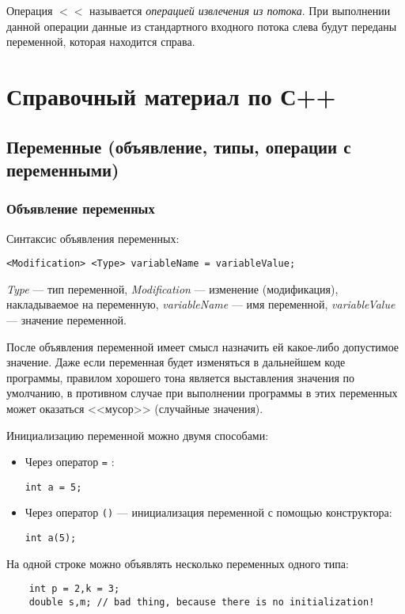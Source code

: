 Операция $<<$ называется \textit{операцией извлечения из потока}. При выполнении данной операции данные из стандартного входного потока слева будут переданы переменной, которая находится справа.

\section{Справочный материал по С++}

\subsection{Переменные (объявление, типы, операции с переменными)}

\subsubsection{Объявление переменных}
Синтаксис объявления переменных:

\lstinline|<Modification> <Type> variableName = variableValue;|

\textit{Type} --- тип переменной, \textit{Modification} --- изменение (модификация), накладываемое на переменную, \textit{variableName} --- имя переменной, \textit{variableValue} --- значение переменной.

После объявления переменной имеет смысл назначить ей какое-либо допустимое значение. Даже если переменная будет изменяться в дальнейшем коде программы, правилом хорошего тона является выставления значения по умолчанию, в противном случае при выполнении программы в этих переменных может оказаться <<мусор>> (случайные значения).

Инициализацию переменной можно двумя способами:
\begin{itemize}
    \item Через оператор \lstinline{=} :
        
        \lstinline|int a = 5;|
    \item Через оператор \lstinline{()} --- инициализация переменной с помощью конструктора:
        
         \lstinline|int a(5);|
\end{itemize}

На одной строке можно объявлять несколько переменных одного типа:
\begin{lstlisting}
    int p = 2,k = 3;
    double s,m; // bad thing, because there is no initialization!
\end{lstlisting}

